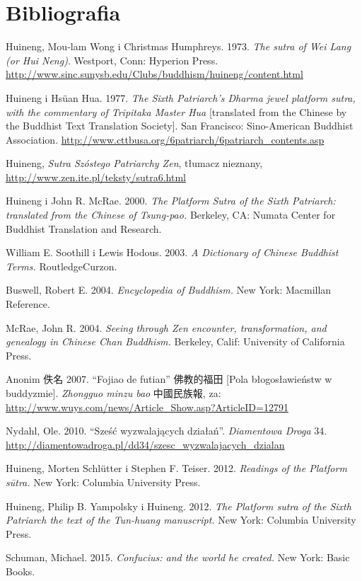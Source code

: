 \section*{Bibliografia}

Huineng, Mou-lam Wong i Christmas Humphreys. 1973. \textit{The sutra of Wei Lang (or Hui Neng)}. Westport, Conn: Hyperion Press. \url{http://www.sinc.sunysb.edu/Clubs/buddhism/huineng/content.html}

Huineng i Hsüan Hua. 1977. \textit{The Sixth Patriarch's Dharma jewel platform sutra, with the commentary of Tripitaka Master Hua} [translated from the Chinese by the Buddhist Text Translation Society]. San Francisco: Sino-American Buddhist Association. \url{http://www.cttbusa.org/6patriarch/6patriarch_contents.asp}

Huineng, \textit{Sutra Szóstego Patriarchy Zen}, tłumacz nieznany, \url{http://www.zen.ite.pl/teksty/sutra6.html}

Huineng i John R. McRae. 2000. \textit{The Platform Sutra of the Sixth Patriarch: translated from the Chinese of Tsung-pao.} Berkeley, CA: Numata Center for Buddhist Translation and Research.

William E. Soothill i Lewis Hodous. 2003. \textit{A Dictionary of Chinese Buddhist Terms.} RoutledgeCurzon.%

Buswell, Robert E. 2004. \textit{Encyclopedia of Buddhism.} New York: Macmillan Reference.

McRae, John R. 2004. \textit{Seeing through Zen encounter, transformation, and genealogy in Chinese Chan Buddhism.} Berkeley, Calif: University of California Press.

Anonim 佚名 2007. ``Fojiao de futian'' 佛教的福田 [Pola błogosławieństw w buddyzmie]. \textit{Zhongguo minzu bao} 中國民族報, za: \url{http://www.wuys.com/news/Article_Show.asp?ArticleID=12791}

Nydahl, Ole. 2010. ``Sześć wyzwalających działań''. \textit{Diamentowa Droga} 34. \url{http://diamentowadroga.pl/dd34/szesc_wyzwalajacych_dzialan}

Huineng, Morten Schlütter i Stephen F. Teiser. 2012. \textit{Readings of the Platform sūtra.} New York: Columbia University Press.%

Huineng, Philip B. Yampolsky i Huineng. 2012. \textit{The Platform sutra of the Sixth Patriarch the text of the Tun-huang manuscript.} New York: Columbia University Press.%

Schuman, Michael. 2015. \textit{Confucius: and the world he created.} New York: Basic Books.
